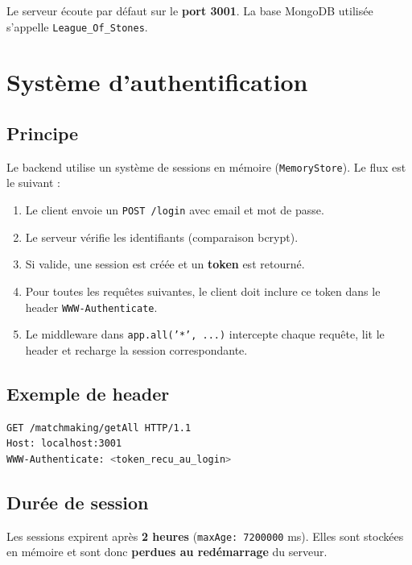 \documentclass[12pt,a4paper]{article}
\begin{document}
\vspace{0.3cm}
Le serveur écoute par défaut sur le \textbf{port 3001}. La base MongoDB utilisée s'appelle \texttt{League\_Of\_Stones}.

\section{Système d'authentification}

\subsection{Principe}

Le backend utilise un système de sessions en mémoire (\texttt{MemoryStore}). Le flux est le suivant :

\begin{enumerate}
    \item Le client envoie un \texttt{POST /login} avec email et mot de passe.
    \item Le serveur vérifie les identifiants (comparaison bcrypt).
    \item Si valide, une session est créée et un \textbf{token} est retourné.
    \item Pour toutes les requêtes suivantes, le client doit inclure ce token dans le header \texttt{WWW-Authenticate}.
    \item Le middleware dans \texttt{app.all('*', ...)} intercepte chaque requête, lit le header et recharge la session correspondante.
\end{enumerate}

\subsection{Exemple de header}

\begin{lstlisting}[language=bash]
GET /matchmaking/getAll HTTP/1.1
Host: localhost:3001
WWW-Authenticate: <token_recu_au_login>
\end{lstlisting}

\subsection{Durée de session}

Les sessions expirent après \textbf{2 heures} (\texttt{maxAge: 7200000} ms). Elles sont stockées en mémoire et sont donc \textbf{perdues au redémarrage} du serveur.
\end{document}
